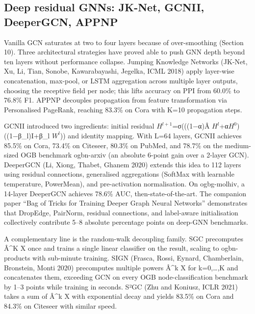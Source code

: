 \documentclass{article}
\begin{document}
\subsection{Deep residual GNNs: JK-Net, GCNII, DeeperGCN, APPNP}\label{deep-residual-gnns-jk-net-gcnii-deepergcn-appnp}

Vanilla GCN saturates at two to four layers because of over-smoothing (Section 10). Three architectural strategies have proved able to push GNN depth beyond ten layers without performance collapse. Jumping Knowledge Networks (JK-Net, Xu, Li, Tian, Sonobe, Kawarabayashi, Jegelka, ICML 2018) apply layer-wise concatenation, max-pool, or LSTM aggregation across multiple layer outputs, choosing the receptive field per node; this lifts accuracy on PPI from 60.0\% to 76.8\% F1. APPNP \citep{klicpera2019predictthenpropaga} decouples propagation from feature transformation via Personalised PageRank, reaching 83.3\% on Cora with K=10 propagation steps.

GCNII \citep{chen2020measuringandreliev} introduced two ingredients: initial residual \(H^{l+1}\)=σ(((1−α)Â \(H^l\)+α\(H^0\))((1−β\_l)I+β\_l \(W^l\))) and identity mapping. With L=64 layers, GCNII achieves 85.5\% on Cora, 73.4\% on Citeseer, 80.3\% on PubMed, and 78.7\% on the medium-sized OGB benchmark ogbn-arxiv (an absolute 6-point gain over a 2-layer GCN). DeeperGCN (Li, Xiong, Thabet, Ghanem 2020) extends this idea to 112 layers using residual connections, generalised aggregations (SoftMax with learnable temperature, PowerMean), and pre-activation normalisation. On ogbg-molhiv, a 14-layer DeeperGCN achieves 78.6\% AUC, then-state-of-the-art. The companion paper ``Bag of Tricks for Training Deeper Graph Neural Networks'' \citep{chen2024asurveyongraphneur} demonstrates that DropEdge, PairNorm, residual connections, and label-aware initialisation collectively contribute 5--8 absolute percentage points on deep-GNN benchmarks.

A complementary line is the random-walk decoupling family. SGC \citep{wu2019graphwavenetfordee} precomputes Â\^{}K X once and trains a single linear classifier on the result, scaling to ogbn-products with sub-minute training. SIGN (Frasca, Rossi, Eynard, Chamberlain, Bronstein, Monti 2020) precomputes multiple powers Â\^{}k X for k=0,\ldots,K and concatenates them, exceeding GCN on every OGB node-classification benchmark by 1--3 points while training in seconds. S²GC (Zhu and Koniusz, ICLR 2021) takes a sum of Â\^{}k X with exponential decay and yields 83.5\% on Cora and 84.3\% on Citeseer with similar speed.
\end{document}
